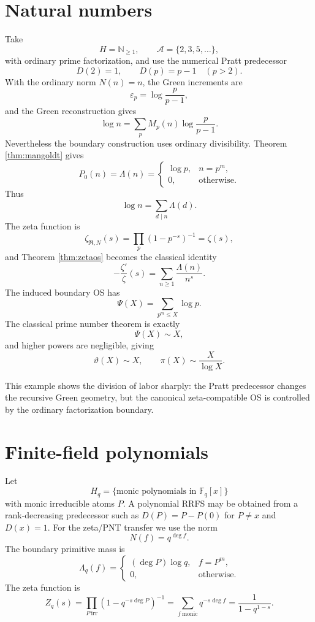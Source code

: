 \documentclass[11pt]{article}
\newcommand{\NN}{\mathbb N}
\newcommand{\FF}{\mathbb F}
\newcommand{\cA}{\mathcal A}
\newcommand{\cR}{\mathfrak R}
\begin{document}
\section{Natural numbers}

Take
\[
H=\NN_{\ge1},\qquad \cA=\{2,3,5,\ldots\},
\]
with ordinary prime factorization, and use the numerical Pratt predecessor
\[
D(2)=1,\qquad D(p)=p-1\quad(p>2).
\]
With the ordinary norm $N(n)=n$, the Green increments are
\[
\varepsilon_p=\log\frac{p}{p-1},
\]
and the Green reconstruction gives
\[
\log n=\sum_p M_p(n)\log\frac{p}{p-1}.
\]
Nevertheless the boundary construction uses ordinary divisibility. Theorem \ref{thm:mangoldt} gives
\[
P_0(n)=\Lambda(n)=
\begin{cases}
\log p,&n=p^m,\\
0,&\text{otherwise}.
\end{cases}
\]
Thus
\[
\log n=\sum_{d\mid n}\Lambda(d).
\]
The zeta function is
\[
\zeta_{\cR,N}(s)=\prod_p(1-p^{-s})^{-1}=\zeta(s),
\]
and Theorem \ref{thm:zetaos} becomes the classical identity
\[
-\frac{\zeta'}{\zeta}(s)
=\sum_{n\ge1}\frac{\Lambda(n)}{n^s}.
\]
The induced boundary OS has
\[
\Psi(X)=\sum_{p^m\le X}\log p.
\]
The classical prime number theorem is exactly
\[
\Psi(X)\sim X,
\]
and higher powers are negligible, giving
\[
\vartheta(X)\sim X,
\qquad
\pi(X)\sim\frac{X}{\log X}.
\]

This example shows the division of labor sharply: the Pratt predecessor changes the recursive Green geometry, but the canonical zeta-compatible OS is controlled by the ordinary factorization boundary.

\section{Finite-field polynomials}\label{sec:finitefield}

Let
\[
H_q=\{\text{monic polynomials in }\FF_q[x]\}
\]
with monic irreducible atoms $P$. A polynomial RRFS may be obtained from a rank-decreasing predecessor such as $D(P)=P-P(0)$ for $P\ne x$ and $D(x)=1$. For the zeta/PNT transfer we use the norm
\[
N(f)=q^{\deg f}.
\]
The boundary primitive mass is
\[
\Lambda_q(f)=
\begin{cases}
(\deg P)\log q,&f=P^m,\\
0,&\text{otherwise}.
\end{cases}
\]
The zeta function is
\[
Z_q(s)
=\prod_{P\ \mathrm{irr}}
(1-q^{-s\deg P})^{-1}
=\sum_{f\ \mathrm{monic}}q^{-s\deg f}
=\frac{1}{1-q^{1-s}}.
\]
\end{document}
